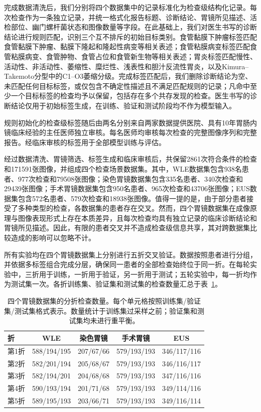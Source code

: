 \documentclass[Afour,sagev,times]{sagej}
\begin{document}
完成数据清洗后，我们分别将四个数据集中的记录标准化为检查级结构化记录。每次检查作为一条独立记录，并统一格式化报告标题、诊断结论、胃镜所见描述、活检部位、幽门螺杆菌状态和图像数量等字段。在此基础上，我们对医生书写的诊断结论进行规则匹配，识别三个互不排斥的初始目标类别。食管黏膜下肿瘤标签匹配食管黏膜下肿瘤、黏膜下隆起和隆起性病变等相关表述；食管粘膜病变标签匹配食管粘膜病变、食管肿物、食管占位和食管新生物等相关表述；胃炎标签匹配慢性、活动性、非活动性、萎缩性、糜烂性、浅表性和胆汁反流性胃炎，以及Kimura--Takemoto分型中的C1--O3萎缩分级。完成标签匹配后，我们删除诊断结论为空、未匹配任何目标标签，或仅包含不确定性描述且不满足匹配规则的记录；凡命中至少一个目标标签的检查均予以保留，包括存在多个共存发现的检查。医生书写的诊断结论仅用于初始标签生成，在训练、验证和测试阶段均不作为模型输入。

规则初始化的检查级标签随后由两名分别来自两家数据提供医院、具有10年胃肠内镜临床经验的主任医师独立审核。每名医师均审核每次检查的完整图像序列和完整报告。经临床审核的标签用于全部模型训练与评估。

经过数据清洗、胃镜筛选、标签生成和临床审核后，共保留2861次符合条件的检查和171591张图像，并组成四个检查场景数据集。其中，WLE数据集包含938名患者、977次检查和79508张图像；染色胃镜数据集包含335名患者、340次检查和29439张图像；手术胃镜数据集包含950名患者、965次检查和43706张图像；EUS数据集包含572名患者、579次检查和18938张图像。值得一提的是，由于部分患者接受了多种类型的检查，各数据集的患者存在交叉。然而，四个胃镜数据集在成像原理与图像表现形式上存在本质差异，且每次检查均具有独立记录的临床诊断结论和胃镜所见描述。因此，有限的患者交叉并不造成检查级信息共享，其对跨数据集比较造成的影响可以忽略不计。

所有实验均在四个胃镜数据集上分别进行五折交叉验证。数据按照患者进行分组，并依据多标签组合完成分层，确保同一患者的全部检查始终位于同一折。在每轮实验中，三折用于训练，一折用于验证，另一折用于测试；五轮实验中，每一折均作为测试集一次。各折训练集、验证集和测试集的检查数量汇总于表~\ref{T1}。

\begin{table}[h]
\small\sf\centering
\caption{四个胃镜数据集的分折检查数量。每个单元格按照训练集/验证集/测试集格式表示。数量统计于训练集过采样之前；验证集和测试集均未进行重平衡。\label{T1}}
\begin{tabular}{lcccc}
\toprule
折 & WLE & 染色胃镜 & 手术胃镜 & EUS \\
\midrule
第1折 & 588/194/195 & 207/67/66 & 579/193/193 & 346/117/116 \\
第2折 & 582/201/194 & 205/68/67 & 579/193/193 & 346/116/117 \\
第3折 & 582/194/201 & 204/68/68 & 579/193/193 & 347/116/116 \\
第4折 & 590/193/194 & 201/71/68 & 579/193/193 & 349/114/116 \\
第5折 & 589/195/193 & 203/66/71 & 579/193/193 & 349/116/114 \\
\bottomrule
\end{tabular}
\end{table}
\end{document}
